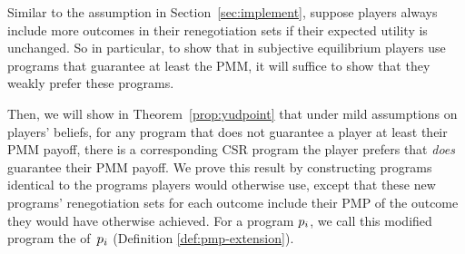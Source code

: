 \documentclass[sigconf]{aamas}
\theoremstyle{definition}
\begin{document}

Similar to the
assumption
in Section~\ref{sec:implement},
suppose
players always include
more outcomes in their renegotiation
sets if their expected
utility is unchanged.
So in particular, to show that in subjective equilibrium players use programs
that guarantee at least the PMM,
it will suffice to show that
they weakly prefer these programs.

Then, 
we will show in
Theorem~\ref{prop:yudpoint}
that
under
mild assumptions on players' beliefs,
for any program
that
does not guarantee
a player at least
their PMM payoff,
there is a corresponding CSR
program the player prefers
that \textit{does}
guarantee their PMM
payoff.
We prove this
result
by constructing programs identical
to the programs
players would otherwise use,
except that these new programs'
renegotiation sets
for each outcome
include their PMP
of the
outcome they would have otherwise achieved.
For a program $p_i$, we call this 
modified program the 
 of~$p_i$ 
(Definition \ref{def:pmp-extension}).
\end{document}

